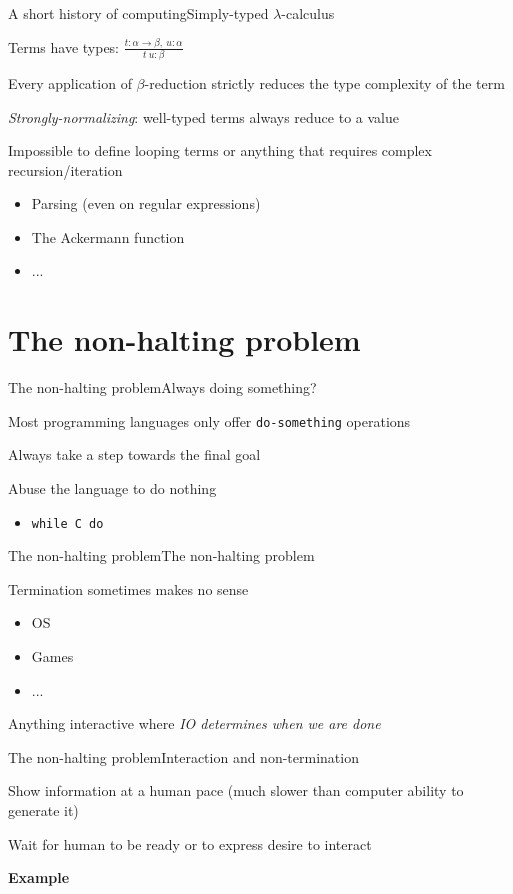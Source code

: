 \documentclass{beamer}
\begin{document}
\begin{slide}{A short history of computing}{Simply-typed $\lambda$-calculus}{
\item Terms have types: $\frac{t:\alpha\rightarrow \beta,\ u:\alpha}{t\ u:\beta}$
\item Every application of $\beta$-reduction strictly reduces the type complexity of the term
\item \textit{Strongly-normalizing}: well-typed terms always reduce to a value
\item Impossible to define looping terms or anything that requires complex recursion/iteration
\begin{itemize}
\item Parsing (even on regular expressions)
\item The Ackermann function
\item ...
\end{itemize}
}\end{slide}

\section{The non-halting problem}
\begin{slide}{The non-halting problem}{Always doing something?}{
\item Most programming languages only offer \texttt{do-something} operations
\item Always take a step towards the final goal
\item Abuse the language to do nothing
\begin{itemize}
\item \texttt{while C do {}}
\end{itemize}
}\end{slide}

\begin{slide}{The non-halting problem}{The non-halting problem}{
\item Termination sometimes makes no sense
\begin{itemize}
\item OS
\item Games
\item ...
\end{itemize}
\item Anything interactive where \textit{IO determines when we are done}
}\end{slide}

\begin{slide}{The non-halting problem}{Interaction and non-termination}{
\item Show information at a human pace (much slower than computer ability to generate it)
\item Wait for human to be ready or to express desire to interact
\item \textbf{Example}
}\end{slide}
\end{document}
